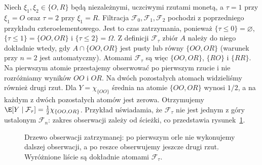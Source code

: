 \begin{przyklad}
Niech $\xi_1,\xi_2\in\{O,R\}$ będą niezależnymi,
uczciwymi rzutami monetą, a
$\tau=1$ przy $\xi_1=O$ oraz $\tau=2$ przy $\xi_1=R$.
Filtracja $\mathcal F_0,\mathcal F_1,\mathcal F_2$
pochodzi z poprzedniego przykładu czteroelementowego.
Jest to czas zatrzymania, ponieważ
$\{\tau\leq0\}=\varnothing$, $\{\tau\leq1\}=\{OO,OR\}$
i $\{\tau\leq2\}=\Omega$.
Z definicji $\mathcal F_\tau$ zbiór $A$ należy
do niego dokładnie wtedy, gdy $A\cap\{OO,OR\}$
jest pusty lub równy $\{OO,OR\}$ (warunek przy
$n=2$ jest automatyczny).
Atomami $\mathcal F_\tau$ są więc
$\{OO,OR\}$, $\{RO\}$ i $\{RR\}$.
Na pierwszym atomie przestajemy obserwować po
pierwszym rzucie i nie rozróżniamy wyników
$OO$ i $OR$. Na dwóch pozostałych atomach
widzieliśmy również drugi rzut.
Dla $Y=\chi_{\{OO\}}$ średnia na atomie
$\{OO,OR\}$ wynosi $1/2$, a na każdym
z dwóch pozostałych atomów jest zerowa. Otrzymujemy
$\E[Y\mid\mathcal F_\tau]
=\frac12\chi_{\{OO,OR\}}$.
Przykład uświadamia, że $\mathcal F_\tau$ nie jest
jednym z góry ustalonym $\mathcal F_n$:
zakres obserwacji zależy od ścieżki, co przedstawia
rysunek~\ref{fig:rp1-13-stopped-tree}.
\end{przyklad}

\begin{figure}[htbp]
\centering
{}
\caption{Drzewo obserwacji zatrzymanej: po pierwszym orle
nie wykonujemy dalszej obserwacji, a po reszce obserwujemy
jeszcze drugi rzut. Wyróżnione liście są dokładnie
atomami $\mathcal F_\tau$.}
\label{fig:rp1-13-stopped-tree}
\end{figure}


